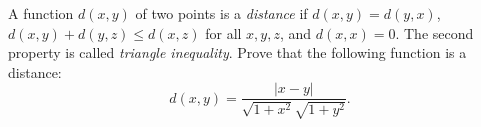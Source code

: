 A function $d(x, y)$ of two points is a \emph{distance} if $d(x, y) = d(y, x)$, $d(x, y) + d(y, z) \leq d(x, z)$ for all $x, y, z$, and $d(x, x) = 0$. The second property is called \emph{triangle inequality}. Prove that the following function is a distance:
\[ d(x, y) = \frac{|x - y|}{\sqrt{1 + x^2}\sqrt{1 + y^2}}. \]
